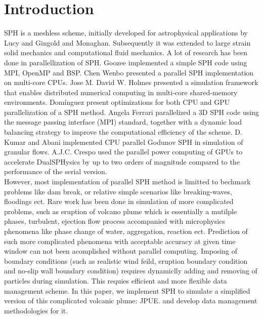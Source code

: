 \documentclass[10pt,a4paper]{article}
\begin{document}
\section{Introduction}
SPH is a meshless scheme, initially developed for astrophysical applications by Lucy\citep{lucy1977numerical} and Gingold and Monaghan\citep{gingold1977smoothed}. 
Subsequently it was extended to large strain solid mechanics and computational fluid mechanics. 
A lot of research has been done in parallellization of SPH. 
Goozee\citep{goozee2003distributed} implemented a simple SPH code using MPI, OpenMP and BSP. 
Chen Wenbo\citep{wenbo2014performance} presented a parallel SPH implementation on multi-core CPUs. 
Jose M. David W. Holmes\citep{holmes2011framework} presented a simulation framework that enables distributed numerical computing in multi-core shared-memory environments. 
Domínguez\citep{dominguez2011optimization} present optimizations for both CPU and GPU parallelization of a SPH method. 
Angela Ferrari\citep{ferrari2009new} parallelized a 3D SPH code using the message passing interface (MPI) standard, together with a dynamic load balancing strategy to improve the computational efficiency of the scheme. 
D. Kumar and Abani\citep{kumar2013parallel} implemented CPU parallel Godunov SPH in simulation of granular flows.
A.J.C. Crespo\citep{crespo2015dualsphysics} used the parallel power computing of GPUs to accelerate DualSPHysics by up to two orders of magnitude compared to the performance of the serial version.\\
However, most implementation of parallel SPH method is limitted to bechmark problems like dam break, or relative simple scenarios like breaking-waves, floodings ect. Rare work has been done in simulation of more complicated problems, such as eruption of volcano plume which is essentially a mutilple phases, turbulent, ejection flow process accompanied with microphysics phenomena like phase change of water, aggregation, reaction ect. Prediction of such more complicated phenomena with acceptable accuracy at given time window can not been acomplished without parallel computing. Imposing of boundary conditions (such as realistic wind feild, eruption boundary condition and no-slip wall boundary condition) requires dynamiclly adding and removing of particles during simulation. This requies efficient and more flexible data management scheme. In this paper, we implement SPH to simulate a simplified version of this complicated volcanic plume: JPUE. and develop data management methodologies for it.\\
\end{document}
